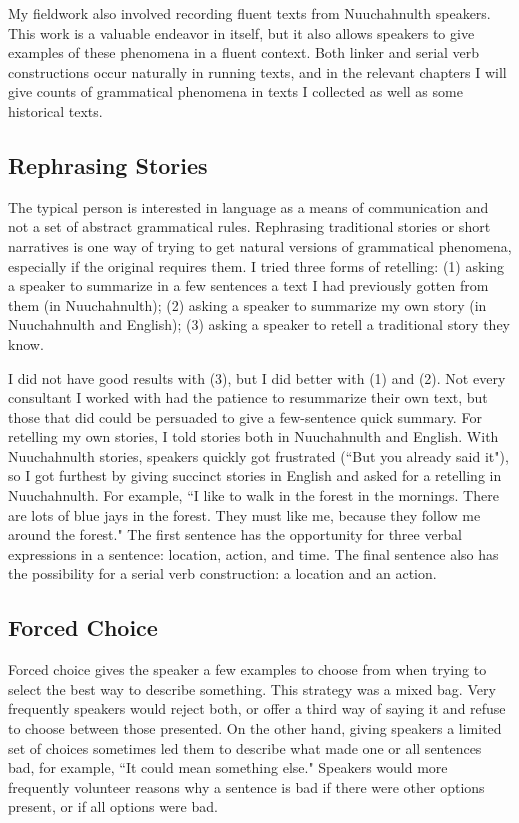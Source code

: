 My fieldwork also involved recording fluent texts from Nuuchahnulth speakers. This work is a valuable endeavor in itself, but it also allows speakers to give examples of these phenomena in a fluent context. Both linker and serial verb constructions occur naturally in running texts, and in the relevant chapters I will give counts of grammatical phenomena in texts I collected as well as some historical texts.

\subsection{Rephrasing Stories}

The typical person is interested in language as a means of communication and not a set of abstract grammatical rules. Rephrasing traditional stories or short narratives is one way of trying to get natural versions of grammatical phenomena, especially if the original requires them. I tried three forms of retelling: (1) asking a speaker to summarize in a few sentences a text I had previously gotten from them (in Nuuchahnulth); (2) asking a speaker to summarize my own story (in Nuuchahnulth and English); (3) asking a speaker to retell a traditional story they know.

I did not have good results with (3), but I did better with (1) and (2). Not every consultant I worked with had the patience to resummarize their own text, but those that did could be persuaded to give a few-sentence quick summary. For retelling my own stories, I told stories both in Nuuchahnulth and English. With Nuuchahnulth stories, speakers quickly got frustrated (``But you already said it"), so I got furthest by giving succinct stories in English and asked for a retelling in Nuuchahnulth. For example, ``I like to walk in the forest in the mornings. There are lots of blue jays in the forest. They must like me, because they follow me around the forest." The first sentence has the opportunity for three verbal expressions in a sentence: location, action, and time. The final sentence also has the possibility for a serial verb construction: a location and an action.

\subsection{Forced Choice}

Forced choice gives the speaker a few examples to choose from when trying to select the best way to describe something. This strategy was a mixed bag. Very frequently speakers would reject both, or offer a third way of saying it and refuse to choose between those presented. On the other hand, giving speakers a limited set of choices sometimes led them to describe what made one or all sentences bad, for example, ``It could mean something else." Speakers would more frequently volunteer reasons why a sentence is bad if there were other options present, or if all options were bad.

